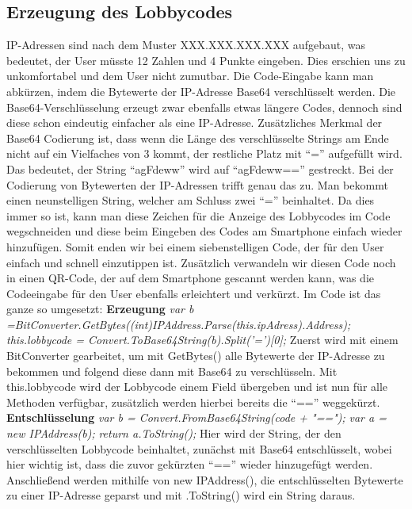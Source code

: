 \subsection{Erzeugung des Lobbycodes}
IP-Adressen sind nach dem Muster XXX.XXX.XXX.XXX aufgebaut, was bedeutet, der User müsste 12 Zahlen und 4 Punkte eingeben. Dies erschien uns zu unkomfortabel und dem User nicht zumutbar. Die Code-Eingabe kann man abkürzen, indem die Bytewerte der IP-Adresse Base64 verschlüsselt werden. Die Base64-Verschlüsselung erzeugt zwar ebenfalls etwas längere Codes, dennoch sind diese schon eindeutig einfacher als eine IP-Adresse. Zusätzliches Merkmal der Base64 Codierung ist, dass wenn die Länge des verschlüsselte Strings am Ende nicht auf ein Vielfaches von 3 kommt, der restliche Platz mit “=” aufgefüllt wird. Das bedeutet, der String “agFdeww” wird auf “agFdeww==” gestreckt. Bei der Codierung von Bytewerten der IP-Adressen trifft genau das zu. Man bekommt einen neunstelligen String, welcher am Schluss zwei “=” beinhaltet. Da dies immer so ist, kann man diese Zeichen für die Anzeige des Lobbycodes im Code wegschneiden und diese beim Eingeben des Codes am Smartphone einfach wieder hinzufügen. Somit enden wir bei einem siebenstelligen Code, der für den User einfach und schnell einzutippen ist. Zusätzlich verwandeln wir  diesen Code noch in einen QR-Code, der auf dem Smartphone gescannt werden kann, was die Codeeingabe für den User ebenfalls erleichtert und verkürzt. Im Code ist das ganze so umgesetzt:
\newline
\newline
\textbf{Erzeugung}
\newline  \newline
\textit{var b =BitConverter.GetBytes((int)IPAddress.Parse(this.ipAdress).Address);}
\newline
\textit{this.lobbycode = Convert.ToBase64String(b).Split('=')[0];}
\newline \newline
Zuerst wird mit einem BitConverter gearbeitet, um mit GetBytes() alle Bytewerte der IP-Adresse zu bekommen und folgend diese dann mit Base64 zu verschlüsseln. Mit this.lobbycode wird der Lobbycode einem Field übergeben und ist nun für alle Methoden verfügbar, zusätzlich werden hierbei bereits die “==” weggekürzt.
\newline \newline
\textbf{Entschlüsselung}
\newline \newline
\textit{var b = Convert.FromBase64String(code + "==");}
\newline
\textit{var a = new IPAddress(b);}
\newline
\textit{return a.ToString();}
\newline \newline
Hier wird der String, der den verschlüsselten Lobbycode beinhaltet, zunächst mit Base64 entschlüsselt, wobei hier wichtig ist, dass die zuvor gekürzten “==” wieder hinzugefügt werden. Anschließend werden mithilfe von new IPAddress(), die entschlüsselten Bytewerte zu einer IP-Adresse geparst und mit .ToString() wird ein String daraus.
